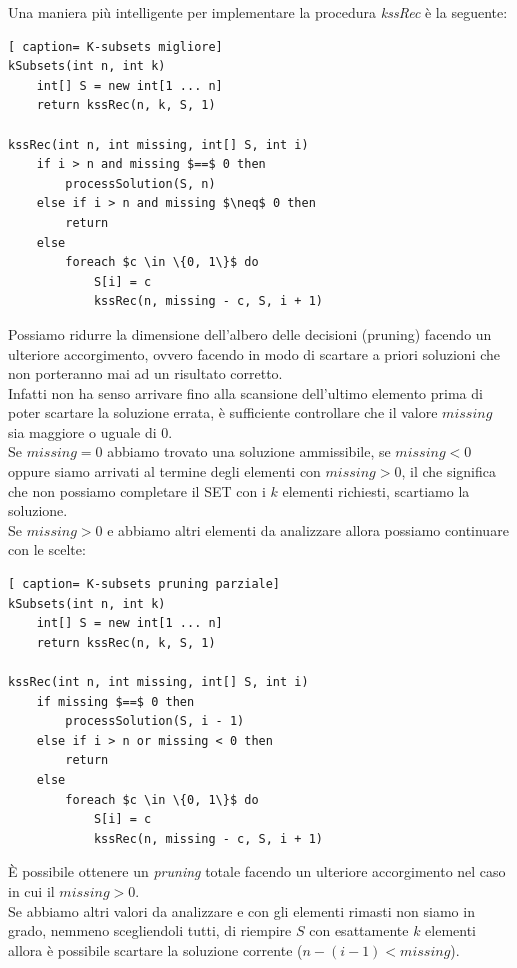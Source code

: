 \documentclass[../cheatSheetAlgoritmi.tex]{subfiles}
\begin{document}
\begin{flushleft}
Una maniera più intelligente per implementare la procedura \emph{kssRec} è la seguente:
\end{flushleft}
\begin{lstlisting}[ caption= K-subsets migliore]
kSubsets(int n, int k)
	int[] S = new int[1 ... n]
	return kssRec(n, k, S, 1)

kssRec(int n, int missing, int[] S, int i)
	if i > n and missing $==$ 0 then
		processSolution(S, n)
	else if i > n and missing $\neq$ 0 then
		return 
	else
		foreach $c \in \{0, 1\}$ do
			S[i] = c
			kssRec(n, missing - c, S, i + 1)
\end{lstlisting}
Possiamo ridurre la dimensione dell'albero delle decisioni (pruning) facendo un ulteriore accorgimento, ovvero facendo in  modo di scartare a priori soluzioni che non porteranno mai ad un risultato corretto. \\
Infatti non ha senso arrivare fino alla scansione dell'ultimo elemento prima di poter scartare la soluzione errata, è sufficiente controllare che il valore $missing$ sia maggiore o uguale di $0$. \\
Se $missing = 0$ abbiamo trovato una soluzione ammissibile, se $missing < 0$ oppure siamo arrivati al termine degli elementi con $missing > 0$, il che significa che non possiamo completare il SET con i $k$ elementi richiesti, scartiamo la soluzione. \\
Se $missing > 0$ e abbiamo altri elementi da analizzare allora possiamo continuare con le scelte:
 \begin{lstlisting}[ caption= K-subsets pruning parziale]
kSubsets(int n, int k)
	int[] S = new int[1 ... n]
	return kssRec(n, k, S, 1)

kssRec(int n, int missing, int[] S, int i)
	if missing $==$ 0 then
		processSolution(S, i - 1)
	else if i > n or missing < 0 then
		return 
	else
		foreach $c \in \{0, 1\}$ do
			S[i] = c
			kssRec(n, missing - c, S, i + 1)
\end{lstlisting}
È 	possibile ottenere un \emph{pruning} totale facendo un ulteriore accorgimento nel caso in cui il $missing > 0$. \\
Se abbiamo altri valori da analizzare e con gli elementi rimasti non siamo in grado, nemmeno scegliendoli tutti, di riempire $S$ con esattamente $k$ elementi allora è possibile scartare la soluzione corrente ($n - (i - 1) < missing$).  
 
\end{document}
